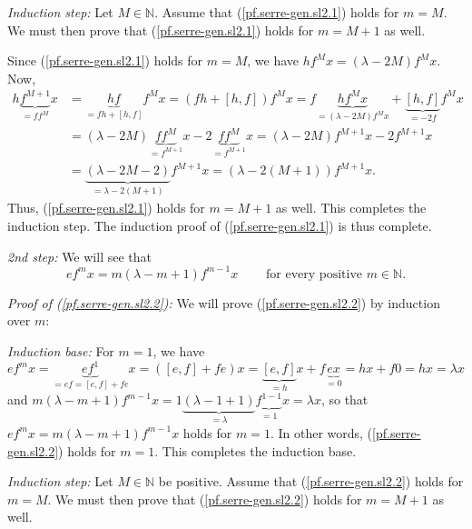 \documentclass[etingof-lie.tex]{subfiles}
\begin{document}
\textit{Induction step:} Let $M\in\mathbb{N}$. Assume that
(\ref{pf.serre-gen.sl2.1}) holds for $m=M$. We must then prove that
(\ref{pf.serre-gen.sl2.1}) holds for $m=M+1$ as well.

Since (\ref{pf.serre-gen.sl2.1}) holds for $m=M$, we have $hf^{M}x=\left(
\lambda-2M\right)  f^{M}x$. Now,%
\begin{align*}
h\underbrace{f^{M+1}}_{=ff^{M}}x  &  =\underbrace{hf}_{=fh+\left[  h,f\right]
}f^{M}x=\left(  fh+\left[  h,f\right]  \right)  f^{M}x=f\underbrace{hf^{M}%
x}_{=\left(  \lambda-2M\right)  f^{M}x}+\underbrace{\left[  h,f\right]
}_{=-2f}f^{M}x\\
&  =\left(  \lambda-2M\right)  \underbrace{ff^{M}}_{=f^{M+1}}%
x-2\underbrace{ff^{M}}_{=f^{M+1}}x=\left(  \lambda-2M\right)  f^{M+1}%
x-2f^{M+1}x\\
&  =\underbrace{\left(  \lambda-2M-2\right)  }_{=\lambda-2\left(  M+1\right)
}f^{M+1}x=\left(  \lambda-2\left(  M+1\right)  \right)  f^{M+1}x.
\end{align*}
Thus, (\ref{pf.serre-gen.sl2.1}) holds for $m=M+1$ as well. This completes the
induction step. The induction proof of (\ref{pf.serre-gen.sl2.1}) is thus complete.

\textit{2nd step:} We will see that%
\begin{equation}
ef^{m}x=m\left(  \lambda-m+1\right)  f^{m-1}x\ \ \ \ \ \ \ \ \ \ \text{for
every positive }m\in\mathbb{N}. \label{pf.serre-gen.sl2.2}%
\end{equation}


\textit{Proof of (\ref{pf.serre-gen.sl2.2}):} We will prove
(\ref{pf.serre-gen.sl2.2}) by induction over $m$:

\textit{Induction base:} For $m=1$, we have%
\[
ef^{m}x=\underbrace{ef^{1}}_{=ef=\left[  e,f\right]  +fe}x=\left(  \left[
e,f\right]  +fe\right)  x=\underbrace{\left[  e,f\right]  }_{=h}%
x+f\underbrace{ex}_{=0}=hx+f0=hx=\lambda x
\]
and $m\left(  \lambda-m+1\right)  f^{m-1}x=1\underbrace{\left(  \lambda
-1+1\right)  }_{=\lambda}\underbrace{f^{1-1}}_{=1}x=\lambda x$, so that
$ef^{m}x=m\left(  \lambda-m+1\right)  f^{m-1}x$ holds for $m=1$. In other
words, (\ref{pf.serre-gen.sl2.2}) holds for $m=1$. This completes the
induction base.

\textit{Induction step:} Let $M\in\mathbb{N}$ be positive. Assume that
(\ref{pf.serre-gen.sl2.2}) holds for $m=M$. We must then prove that
(\ref{pf.serre-gen.sl2.2}) holds for $m=M+1$ as well.
\end{document}
